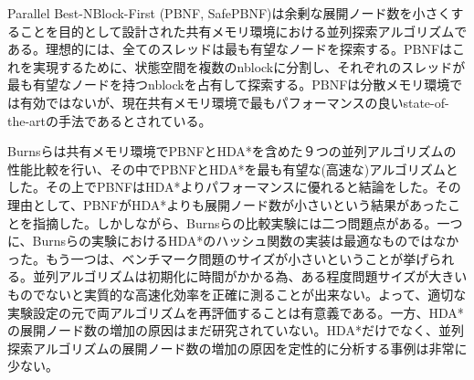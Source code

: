 \documentclass[uplatex]{jsarticle}
\begin{document}
Parallel Best-NBlock-First (PBNF, SafePBNF)は余剰な展開ノード数を小さくすることを目的として設計された共有メモリ環境における並列探索アルゴリズムである\cite{Burns2010}。理想的には、全てのスレッドは最も有望なノードを探索する。PBNFはこれを実現するために、状態空間を複数のnblockに分割し、それぞれのスレッドが最も有望なノードを持つnblockを占有して探索する。PBNFは分散メモリ環境では有効ではないが、現在共有メモリ環境で最もパフォーマンスの良いstate-of-the-artの手法であるとされている。

Burnsらは共有メモリ環境でPBNFとHDA*を含めた９つの並列アルゴリズムの性能比較を行い、その中でPBNFとHDA*を最も有望な(高速な)アルゴリズムとした。その上でPBNFはHDA*よりパフォーマンスに優れると結論をした。その理由として、PBNFがHDA*よりも展開ノード数が小さいという結果があったことを指摘した。しかしながら、Burnsらの比較実験には二つ問題点がある。一つに、Burnsらの実験におけるHDA*のハッシュ関数の実装は最適なものではなかった。もう一つは、ベンチマーク問題のサイズが小さいということが挙げられる。並列アルゴリズムは初期化に時間がかかる為、ある程度問題サイズが大きいものでないと実質的な高速化効率を正確に測ることが出来ない。よって、適切な実験設定の元で両アルゴリズムを再評価することは有意義である。一方、HDA*の展開ノード数の増加の原因はまだ研究されていない。HDA*だけでなく、並列探索アルゴリズムの展開ノード数の増加の原因を定性的に分析する事例は非常に少ない。
\end{document}
